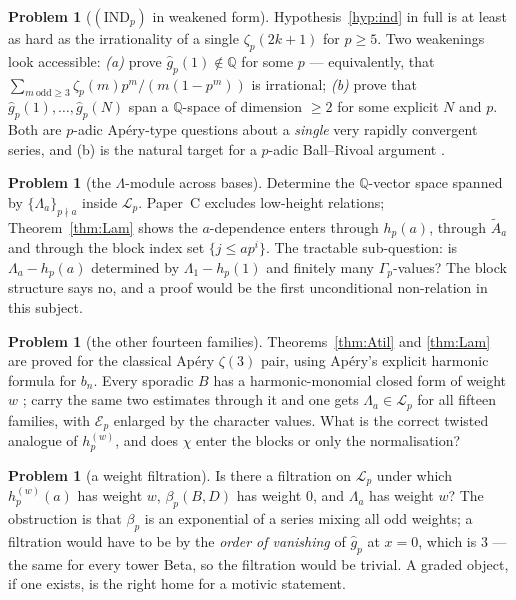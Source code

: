 \documentclass[11pt,reqno]{article}
\newcommand{\QQ}{\mathbb{Q}}
\newcommand{\Gp}{\Gamma_p}
\newcommand{\gh}{\widehat{g}_p}
\newcommand{\bet}{\beta_p}
\newcommand{\Atil}{\widetilde{A}}
\newcommand{\El}{\mathcal{E}_p}
\newcommand{\Lalg}{\mathcal{L}_p}
\theoremstyle{plain}
\theoremstyle{definition}
\newtheorem{problem}[theorem]{Problem}
\theoremstyle{remark}
\numberwithin{equation}{section}
\begin{document}
\begin{problem}[$(\mathrm{IND}_p)$ in weakened form]\label{prob:indweak}
Hypothesis~\ref{hyp:ind} in full is at least as hard as the irrationality of a
single $\zeta_p(2k+1)$ for $p\ge5$.  Two weakenings look accessible:
\emph{(a)} prove $\gh(1)\notin\QQ$ for some $p$ --- equivalently, that
$\sum_{m\ \mathrm{odd}\ge3}\zeta_p(m)p^m/(m(1-p^m))$ is irrational;
\emph{(b)} prove that $\gh(1),\dots,\gh(N)$ span a $\QQ$-space of dimension
$\ge2$ for some explicit $N$ and $p$.  Both are $p$-adic Ap\'ery-type questions
about a \emph{single} very rapidly convergent series, and (b) is the natural
target for a $p$-adic Ball--Rivoal argument \cite{LaiSprang2023,FSZ2018}.
\end{problem}

\begin{problem}[the $\Lambda$-module across bases]\label{prob:bases}
Determine the $\QQ$-vector space spanned by $\{\Lambda_a\}_{p\nmid a}$ inside
$\Lalg$.  Paper~C excludes low-height relations; Theorem~\ref{thm:Lam} shows the
$a$-dependence enters through $h_p(a)$, through $\Atil_a$ and through the block
index set $\{j\le ap^i\}$.  The tractable sub-question: is
$\Lambda_a-h_p(a)$ determined by $\Lambda_1-h_p(1)$ and finitely many
$\Gp$-values?  The block structure says no, and a proof would be the first
unconditional non-relation in this subject.
\end{problem}

\begin{problem}[the other fourteen families]\label{prob:families}
Theorems~\ref{thm:Atil} and \ref{thm:Lam} are proved for the classical Ap\'ery
$\zeta(3)$ pair, using Ap\'ery's explicit harmonic formula for $b_n$.  Every
sporadic $B$ has a harmonic-monomial closed form of weight $w$
\cite[\S6]{PaperA}; carry the same two estimates through it and one gets
$\Lambda_a\in\Lalg$ for all fifteen families, with $\El$ enlarged by the
character values.  What is the correct twisted analogue of $h^{(w)}_p$, and does
$\chi$ enter the blocks or only the normalisation?
\end{problem}

\begin{problem}[a weight filtration]\label{prob:weight}
Is there a filtration on $\Lalg$ under which $h^{(w)}_p(a)$ has weight $w$,
$\bet(B,D)$ has weight $0$, and $\Lambda_a$ has weight $w$?  The obstruction is
that $\bet$ is an exponential of a series mixing all odd weights; a filtration
would have to be by the \emph{order of vanishing} of $\gh$ at $x=0$, which is
$3$ --- the same for every tower Beta, so the filtration would be trivial.  A graded object, if one exists, is the right home for a
motivic statement.
\end{problem}
\end{document}
